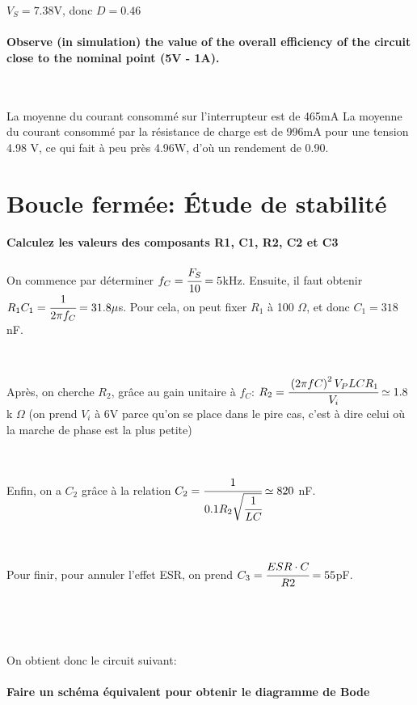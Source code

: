 \documentclass{article}
\begin{document}
$V_S=7.38$V, donc $D=0.46$


\paragraph{Observe (in simulation) the value of the overall efficiency of the circuit close to the nominal point (5V - 1A).}

~

La moyenne du courant consommé sur l’interrupteur est de 465mA
La moyenne du courant consommé par la résistance de charge est de 996mA pour une tension 4.98 V, ce qui fait à peu près 4.96W, d’où un rendement de 0.90.

\section{Boucle fermée: Étude de stabilité}

\paragraph{Calculez les valeurs des composants R1, C1, R2, C2 et C3}
On commence par déterminer $f_C = \cfrac{F_S}{10} = 5$kHz.
Ensuite, il faut obtenir $R_1C_1=\cfrac{1}{2\pi f_C} = 31.8\mu$s.
Pour cela, on peut fixer $R_1$ à 100 $\Omega$, et donc $C_1 = 318$nF.

~

Après, on cherche $R_2$, grâce au gain unitaire à $f_C$: $R_2=\cfrac{\left(2\pi f C\right)^2V_PLCR_1}{V_i} \simeq 1.8 $ k $\Omega$
(on prend $V_i$ à 6V parce qu’on se place dans le pire cas, c’est à dire celui où la marche de phase est la plus petite)

~

Enfin, on a $C_2$ grâce à la relation $C_2=\cfrac{1}{0.1R_2\sqrt{\cfrac{1}{LC}}} \simeq 820$ nF.

~

Pour finir, pour annuler l’effet ESR, on prend $C_3=\cfrac{ESR\cdot C}{R2}=55$pF.

~

~

On obtient donc le circuit suivant:


\paragraph{Faire un schéma équivalent pour obtenir le diagramme de Bode}
\end{document}
